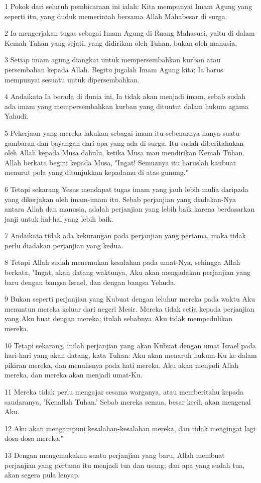 \par 1 Pokok dari seluruh pembicaraan ini ialah: Kita mempunyai Imam Agung yang seperti itu, yang duduk memerintah bersama Allah Mahabesar di surga.
\par 2 Ia mengerjakan tugas sebagai Imam Agung di Ruang Mahasuci, yaitu di dalam Kemah Tuhan yang sejati, yang didirikan oleh Tuhan, bukan oleh manusia.
\par 3 Setiap imam agung diangkat untuk mempersembahkan kurban atau persembahan kepada Allah. Begitu jugalah Imam Agung kita; Ia harus mempunyai sesuatu untuk dipersembahkan.
\par 4 Andaikata Ia berada di dunia ini, Ia tidak akan menjadi imam, sebab sudah ada imam yang mempersembahkan kurban yang dituntut dalam hukum agama Yahudi.
\par 5 Pekerjaan yang mereka lakukan sebagai imam itu sebenarnya hanya suatu gambaran dan bayangan dari apa yang ada di surga. Itu sudah diberitahukan oleh Allah kepada Musa dahulu, ketika Musa mau mendirikan Kemah Tuhan. Allah berkata begini kepada Musa, "Ingat! Semuanya itu haruslah kaubuat menurut pola yang ditunjukkan kepadamu di atas gunung."
\par 6 Tetapi sekarang Yesus mendapat tugas imam yang jauh lebih mulia daripada yang dikerjakan oleh imam-imam itu. Sebab perjanjian yang diadakan-Nya antara Allah dan manusia, adalah perjanjian yang lebih baik karena berdasarkan janji untuk hal-hal yang lebih baik.
\par 7 Andaikata tidak ada kekurangan pada perjanjian yang pertama, maka tidak perlu diadakan perjanjian yang kedua.
\par 8 Tetapi Allah sudah menemukan kesalahan pada umat-Nya, sehingga Allah berkata, "Ingat, akan datang waktunya, Aku akan mengadakan perjanjian yang baru dengan bangsa Israel, dan dengan bangsa Yehuda.
\par 9 Bukan seperti perjanjian yang Kubuat dengan leluhur mereka pada waktu Aku menuntun mereka keluar dari negeri Mesir. Mereka tidak setia kepada perjanjian yang Aku buat dengan mereka; itulah sebabnya Aku tidak mempedulikan mereka.
\par 10 Tetapi sekarang, inilah perjanjian yang akan Kubuat dengan umat Israel pada hari-hari yang akan datang, kata Tuhan: Aku akan menaruh hukum-Ku ke dalam pikiran mereka, dan menulisnya pada hati mereka. Aku akan menjadi Allah mereka, dan mereka akan menjadi umat-Ku.
\par 11 Mereka tidak perlu mengajar sesama warganya, atau memberitahu kepada saudaranya, 'Kenallah Tuhan.' Sebab mereka semua, besar kecil, akan mengenal Aku.
\par 12 Aku akan mengampuni kesalahan-kesalahan mereka, dan tidak mengingat lagi dosa-dosa mereka."
\par 13 Dengan mengemukakan suatu perjanjian yang baru, Allah membuat perjanjian yang pertama itu menjadi tua dan usang; dan apa yang sudah tua, akan segera pula lenyap.

